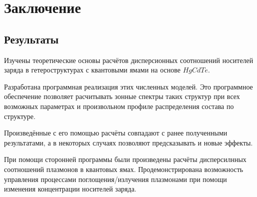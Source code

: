 \documentclass[../main.tex]{subfiles}
\begin{document}
\chapter{Заключение}

\section{Результаты}

    Изучены теоретические основы расчётов дисперсионных соотношений носителей заряда в
    гетероструктурах с квантовыми ямами на основе $HgCdTe$.

    Разработана программная реализация этих численных моделей.
    Это программное обеспечение позволяет расчитывать зонные спектры таких структур при 
    всех возможных параметрах и произвольном профиле распределения состава по структуре.

    Произведённые с его помощью расчёты совпадают с ранее полученными результатами, а 
    в некоторых случаях позволяют предсказывать и новые эффекты.
    
    При помощи сторонней программы были произведены расчёты дисперсилнных соотношений 
    плазмонов в квантовых ямах. Продемонстрирована возможность управления процессами
    поглощения/излучения плазмонами при помощи изменения концентрации носителей 
    заряда.
\end{document}
